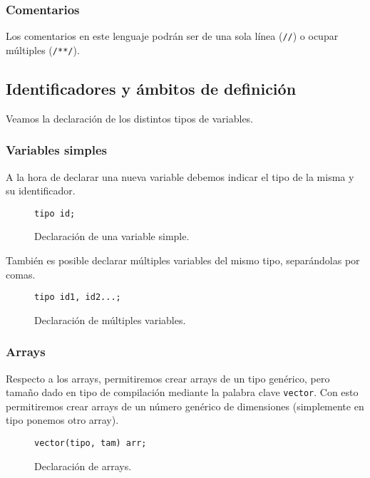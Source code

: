 \subsubsection{Comentarios}
Los comentarios en este lenguaje podrán ser de una sola línea (\lstinline{//}) o
ocupar múltiples (\lstinline{/**/}).

\subsection{Identificadores y ámbitos de definición}
Veamos la declaración de los distintos tipos de variables.
\subsubsection{Variables simples}
A la hora de declarar una nueva variable debemos indicar el tipo de la misma y
su identificador.
\begin{figure}[htbp]
    \centering
    \begin{lstlisting}
tipo id;
    \end{lstlisting}
    \caption{Declaración de una variable simple.}
\end{figure}
También es posible declarar múltiples variables del mismo tipo, separándolas por
comas.
\begin{figure}[htbp]
    \centering
    \begin{lstlisting}
tipo id1, id2...;
    \end{lstlisting}
    \caption{Declaración de múltiples variables.}
\end{figure}


\subsubsection{Arrays}
Respecto a los arrays, permitiremos crear arrays de un tipo genérico, pero
tamaño dado en tipo de compilación mediante la palabra clave \lstinline{vector}.
Con esto permitiremos crear arrays de un número genérico de dimensiones
(simplemente en tipo ponemos otro array).
\begin{figure}[htbp]
    \centering
    \begin{lstlisting}
vector(tipo, tam) arr;
    \end{lstlisting}
    \caption{Declaración de arrays.}
\end{figure}

